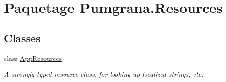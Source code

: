 \hypertarget{namespace_pumgrana_1_1_resources}{\section{Paquetage Pumgrana.\+Resources}
\label{namespace_pumgrana_1_1_resources}
}
\subsection*{Classes}
\begin{DoxyCompactItemize}
\item 
class \hyperlink{class_pumgrana_1_1_resources_1_1_app_resources}{App\+Resources}
\begin{DoxyCompactList}\small\item\em A strongly-\/typed resource class, for looking up localized strings, etc. \end{DoxyCompactList}\end{DoxyCompactItemize}
